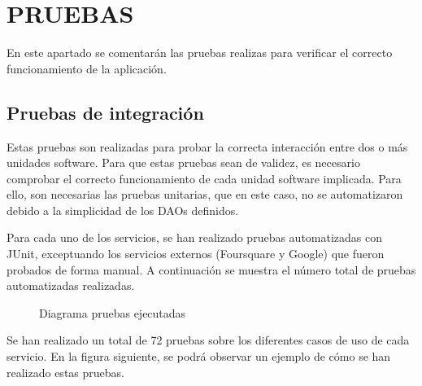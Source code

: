 \chapter[Pruebas]{
  \label{chp:pruebas}
  PRUEBAS
}
\thispagestyle{numberingStyle}
\pagestyle{numberingStyle}

En este apartado se comentarán las pruebas realizas para verificar el correcto funcionamiento de la aplicación.



\section{Pruebas de integración}
Estas pruebas son realizadas para probar la correcta interacción entre dos o más unidades software. Para que estas pruebas sean de validez, es necesario comprobar el correcto funcionamiento de cada unidad software implicada. Para ello, son necesarias las pruebas unitarias, que en este caso, no se automatizaron debido a la simplicidad de los DAOs definidos.

Para cada uno de los servicios, se han realizado pruebas automatizadas con JUnit, exceptuando los servicios externos (Foursquare y Google) que fueron probados de forma manual. A continuación se muestra el número total de pruebas automatizadas realizadas.

\begin{figure}[H]
\centering
{}
\caption{Diagrama pruebas ejecutadas}
\end{figure}

Se han realizado un total de 72 pruebas sobre los diferentes casos de uso de cada servicio. En la figura siguiente, se podrá observar un ejemplo de cómo se han realizado estas pruebas.

